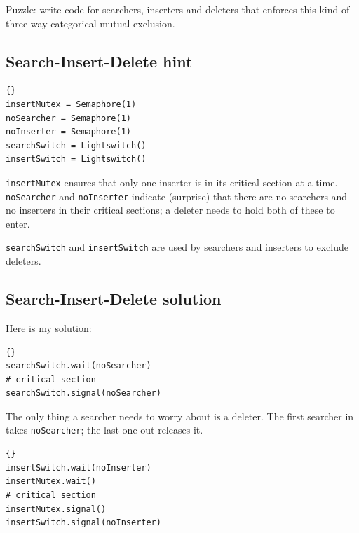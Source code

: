\documentclass{book}
\newcommand{\clearemptydoublepage}{\newpage\cleardoublepage}
\begin{document}
Puzzle: write code for searchers, inserters and deleters that
enforces this kind of three-way categorical mutual exclusion.


\clearemptydoublepage
\subsection{Search-Insert-Delete hint}

\begin{latin}
\begin{latin}
\begin{lstlisting}[title={Search-Insert-Delete hint}]{}
insertMutex = Semaphore(1)
noSearcher = Semaphore(1)
noInserter = Semaphore(1)
searchSwitch = Lightswitch()
insertSwitch = Lightswitch()
\end{lstlisting}
\end{latin}
\end{latin}

{\tt insertMutex} ensures that only one inserter is in its critical
section at a time.  {\tt noSearcher} and {\tt noInserter} indicate
(surprise) that there are no searchers and no inserters in their
critical sections; a deleter needs to hold both of these to enter.

{\tt searchSwitch} and {\tt insertSwitch} are used by searchers and
inserters to exclude deleters.


\clearemptydoublepage
\subsection{Search-Insert-Delete solution}

Here is my solution:

\begin{latin}
\begin{latin}
\begin{lstlisting}[title={Search-Insert-Delete solution (searcher)}]{}
searchSwitch.wait(noSearcher)
# critical section
searchSwitch.signal(noSearcher)
\end{lstlisting}
\end{latin}
\end{latin}

The only thing a searcher needs to worry about is a deleter.
The first searcher in takes {\tt noSearcher}; the last one out
releases it.

\begin{latin}
\begin{latin}
\begin{lstlisting}[title={Search-Insert-Delete solution (inserter)}]{}
insertSwitch.wait(noInserter)
insertMutex.wait()
# critical section
insertMutex.signal()
insertSwitch.signal(noInserter)
\end{lstlisting}
\end{latin}
\end{latin}
\end{document}
